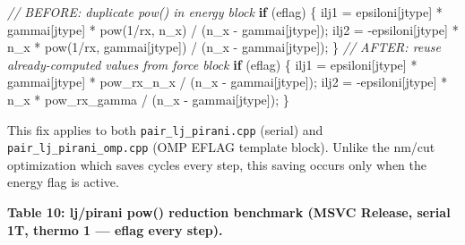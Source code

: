 \documentclass[
  11pt,
]{article}
\newenvironment{Shaded}{}{}
\newcommand{\CommentTok}[1]{\textcolor[rgb]{0.38,0.63,0.69}{\textit{#1}}}
\newcommand{\ControlFlowTok}[1]{\textcolor[rgb]{0.00,0.44,0.13}{\textbf{#1}}}
\newcommand{\DecValTok}[1]{\textcolor[rgb]{0.25,0.63,0.44}{#1}}
\newcommand{\NormalTok}[1]{#1}
\newcommand{\OperatorTok}[1]{\textcolor[rgb]{0.40,0.40,0.40}{#1}}
\begin{document}
\begin{Shaded}
\begin{Highlighting}[]
\CommentTok{// BEFORE: duplicate pow() in energy block}
\ControlFlowTok{if} \OperatorTok{(}\NormalTok{eflag}\OperatorTok{)} \OperatorTok{\{}
\NormalTok{  ilj1 }\OperatorTok{=}\NormalTok{ epsiloni}\OperatorTok{[}\NormalTok{jtype}\OperatorTok{]} \OperatorTok{*}\NormalTok{ gammai}\OperatorTok{[}\NormalTok{jtype}\OperatorTok{]} \OperatorTok{*}\NormalTok{ pow}\OperatorTok{(}\DecValTok{1}\OperatorTok{/}\NormalTok{rx}\OperatorTok{,}\NormalTok{ n\_x}\OperatorTok{)} \OperatorTok{/} \OperatorTok{(}\NormalTok{n\_x }\OperatorTok{{-}}\NormalTok{ gammai}\OperatorTok{[}\NormalTok{jtype}\OperatorTok{]);}
\NormalTok{  ilj2 }\OperatorTok{=} \OperatorTok{{-}}\NormalTok{epsiloni}\OperatorTok{[}\NormalTok{jtype}\OperatorTok{]} \OperatorTok{*}\NormalTok{ n\_x }\OperatorTok{*}\NormalTok{ pow}\OperatorTok{(}\DecValTok{1}\OperatorTok{/}\NormalTok{rx}\OperatorTok{,}\NormalTok{ gammai}\OperatorTok{[}\NormalTok{jtype}\OperatorTok{])} \OperatorTok{/} \OperatorTok{(}\NormalTok{n\_x }\OperatorTok{{-}}\NormalTok{ gammai}\OperatorTok{[}\NormalTok{jtype}\OperatorTok{]);}
\OperatorTok{\}}
\CommentTok{// AFTER: reuse already{-}computed values from force block}
\ControlFlowTok{if} \OperatorTok{(}\NormalTok{eflag}\OperatorTok{)} \OperatorTok{\{}
\NormalTok{  ilj1 }\OperatorTok{=}\NormalTok{ epsiloni}\OperatorTok{[}\NormalTok{jtype}\OperatorTok{]} \OperatorTok{*}\NormalTok{ gammai}\OperatorTok{[}\NormalTok{jtype}\OperatorTok{]} \OperatorTok{*}\NormalTok{ pow\_rx\_n\_x }\OperatorTok{/} \OperatorTok{(}\NormalTok{n\_x }\OperatorTok{{-}}\NormalTok{ gammai}\OperatorTok{[}\NormalTok{jtype}\OperatorTok{]);}
\NormalTok{  ilj2 }\OperatorTok{=} \OperatorTok{{-}}\NormalTok{epsiloni}\OperatorTok{[}\NormalTok{jtype}\OperatorTok{]} \OperatorTok{*}\NormalTok{ n\_x }\OperatorTok{*}\NormalTok{ pow\_rx\_gamma }\OperatorTok{/} \OperatorTok{(}\NormalTok{n\_x }\OperatorTok{{-}}\NormalTok{ gammai}\OperatorTok{[}\NormalTok{jtype}\OperatorTok{]);}
\OperatorTok{\}}
\end{Highlighting}
\end{Shaded}

This fix applies to both \texttt{pair\_lj\_pirani.cpp} (serial) and
\texttt{pair\_lj\_pirani\_omp.cpp} (OMP EFLAG template block). Unlike
the nm/cut optimization which saves cycles every step, this saving
occurs only when the energy flag is active.

\textbf{Table 10: lj/pirani pow() reduction benchmark (MSVC Release,
serial 1T, thermo 1 --- eflag every step).}
\end{document}
